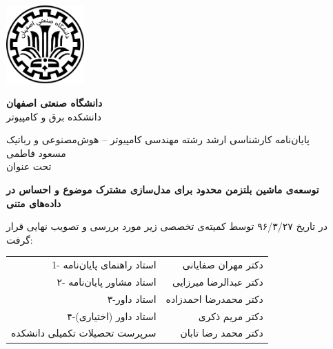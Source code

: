 \thispagestyle{empty}
\begin{center}
\includegraphics[height=3cm]{firstpage-img/iut_logo_fa}

{\large
	\textbf{دانشگاه صنعتی اصفهان}\\
	دانشکده  برق و کامپیوتر
}
	
	\vfill
	
	{\Large
		پایان‌نامه کارشناسی ارشد رشته مهندسی کامپیوتر -- هوش‌مصنوعی و رباتیک \\
		\vspace{.3cm}
		مسعود فاطمی\\
		\vspace{.3cm}
		تحت عنوان\\
	}
\end{center}

\begin{center}
	{\large
		\textbf{ توسعه‌ی ماشین بلتزمن محدود برای مدل‌سازی مشترک موضوع و احساس در داده‌های متنی}
	}
\end{center}
\vspace*{1.8cm}
در تاریخ ۹۶/۳/۲۷ توسط کمیته‌ی تخصصی زیر مورد بررسی و تصویب نهایی قرار گرفت:\\

{\normalsize
	
	\begin{tabular}{rr}
		\vspace*{.8cm}
		1- استاد راهنمای پایان‌نامه  & \hspace{2cm} دکتر مهران صفایانی \\
		\vspace{.8cm}
		۲- استاد مشاور پایان‌نامه &\hspace{2cm} دکتر عبدالرضا میرزایی \\
		\vspace{.8cm}
		۳-استاد داور  &\hspace{2cm}  دکتر محمدرضا احمدزاده\\
		\vspace{.8cm}
		۴-استاد داور (اختیاری) &\hspace{2cm}  دکتر مریم ذکری \\
		\vspace{.8cm}
		سرپرست تحصیلات تکمیلی دانشکده &\hspace{2cm} دکتر محمد رضا تابان \\
	\end{tabular}
}
\restoregeometry
\pagebreak



